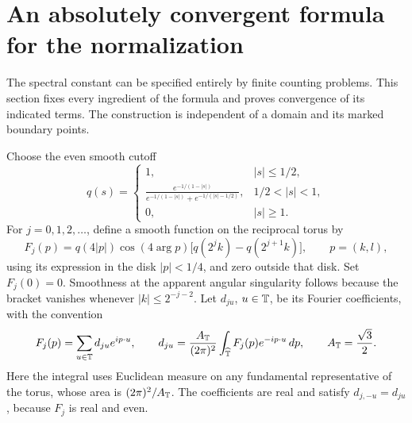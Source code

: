 \section{An absolutely convergent formula for the normalization}
\label{sec:normalization}

The spectral constant can be specified entirely by finite counting problems.
This section fixes every ingredient of the formula and proves convergence of
its indicated terms. The construction is independent of a domain and its
marked boundary points.

Choose the even smooth cutoff
\begin{equation}
 \label{eq:explicit-cutoff}
 q(s)=
 \begin{cases}
  1,& |s|\le1/2,\\[2pt]
  \displaystyle
  \frac{e^{-1/(1-|s|)}}
       {e^{-1/(1-|s|)}+e^{-1/(|s|-1/2)}},&1/2<|s|<1,\\[8pt]
  0,&|s|\ge1.
 \end{cases}
\end{equation}
For \(j=0,1,2,\ldots\), define a smooth function on the reciprocal torus by
\begin{equation}
 \label{eq:normalization-multiplier}
 F_j(p)=q(4|p|)\cos(4\arg p)
                    \bigl[q(2^jk)-q(2^{j+1}k)\bigr],\qquad p=(k,l),
\end{equation}
using its expression in the disk \(|p|<1/4\), and zero outside that disk.
Set \(F_j(0)=0\). Smoothness at the apparent angular singularity follows
because the bracket vanishes whenever \(|k|\le2^{-j-2}\).
Let \(d_{ju}\), \(u\in\mathbb T\), be its Fourier coefficients, with the convention
\begin{equation}
 \label{eq:normalization-fourier}
 F_j(p)=\sum_{u\in\mathbb T}d_{ju}e^{ip\cdot u},\qquad
 d_{ju}=\frac{A_{\mathbb T}}{(2\pi)^2}
        \int_{\widehat{\mathbb T}}F_j(p)e^{-ip\cdot u}\,dp,
 \qquad A_{\mathbb T}=\frac{\sqrt3}{2}.
\end{equation}
Here the integral uses Euclidean measure on any fundamental representative
of the torus, whose area is \((2\pi)^2/A_{\mathbb T}\). The coefficients are real
and satisfy \(d_{j,-u}=d_{ju}\), because \(F_j\) is real and even.

